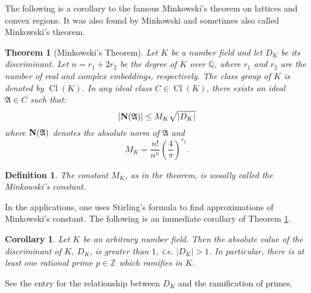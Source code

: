 \documentclass[12pt]{article}
\newtheorem{thm}{Theorem}
\newtheorem{defn}{Definition}
\newtheorem{cor}{Corollary}
\newcommand{\Ints}{\mathbb{Z}}
\newcommand{\Rats}{\mathbb{Q}}
\newcommand{\Cl}{\operatorname{Cl}}
\begin{document}
The following is a corollary to the famous Minkowski's theorem on lattices and convex regions. It was also found by Minkowski and sometimes also called Minkowski's theorem.

\begin{thm}[Minkowski's Theorem]
\label{thm1}
Let $K$ be a number field and let $D_K$ be its discriminant. Let $n=r_1+2r_2$ be the degree of $K$ over $\Rats$, where $r_1$ and $r_2$ are the number of real and complex embeddings, respectively. The class group of $K$ is denoted by $\Cl(K)$. In any ideal class $C\in \Cl(K)$, there exists an ideal $\mathfrak{A}\in C$ such that:
$$|{\bf N}(\mathfrak{A})| \leq M_K \sqrt{|D_K|}$$
where ${\bf N}(\mathfrak{A})$ denotes the absolute norm of $\mathfrak{A}$ and 
$$M_K=\frac{n!}{n^n} \left(\frac{4}{\pi}\right)^{r_2}.$$
\end{thm}

\begin{defn}
The constant $M_K$, as in the theorem, is usually called the Minkowski's constant.
\end{defn}

In the applications, one uses Stirling's formula to find approximations of Minkowski's constant. The following is an immediate corollary of Theorem \ref{thm1}.

\begin{cor}
Let $K$ be an arbitrary number field. Then the absolute value of the discriminant of $K$, $D_K$, is greater than $1$, i.e. $|D_K|>1$. In particular, there is at least one rational prime $p\in \Ints$ which ramifies in $K$. 
\end{cor}

See the entry  for the relationship between $D_K$ and the ramification of primes.
\end{document}
